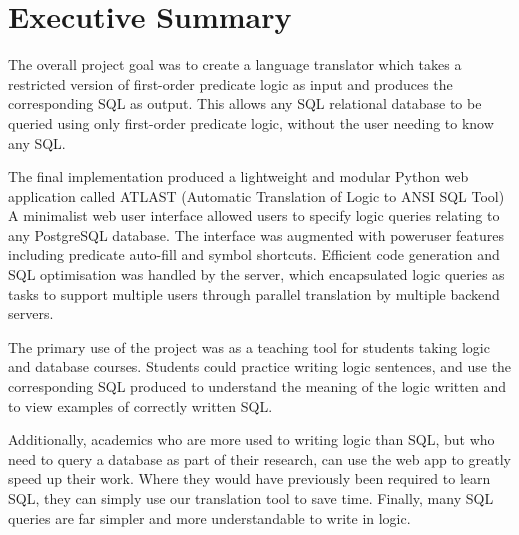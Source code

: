 \documentclass[a4paper, 11pt]{article}
\begin{document}
\renewcommand{\contentsname}{\huge Contents \vspace{1cm}}
\tableofcontents
\clearpage

\setlength{\parskip}{0.3cm} \setlength{\parindent}{0cm}

\section{Executive Summary}

  The overall project goal was to create a language translator which
  takes a restricted version of first-order predicate logic as input and
  produces the corresponding SQL as output. This allows any SQL relational
  database to be queried using only first-order predicate logic, without the
  user needing to know any SQL.

  The final implementation produced a lightweight and modular Python web
  application called ATLAST (Automatic Translation of Logic to ANSI SQL Tool)
  A minimalist web user interface allowed users to specify logic queries
  relating to any PostgreSQL database. The interface was augmented
  with poweruser features including predicate auto-fill and symbol shortcuts.
  Efficient code generation and SQL optimisation was handled by the server,
  which encapsulated logic queries as tasks to support multiple users through
  parallel translation by multiple backend servers.

  The primary use of the project was as a teaching tool for students taking
  logic and database courses. Students could practice writing logic sentences,
  and use the corresponding SQL produced to understand the meaning of the logic
  written and to view examples of correctly written SQL.

  Additionally, academics who are more used to writing logic than SQL, but who
  need to query a database as part of their research, can use the web app to
  greatly speed up their work. Where they would have previously been required to
  learn SQL, they can simply use our translation tool to save time. Finally,
  many SQL queries are far simpler and more understandable to write in logic.
\end{document}
